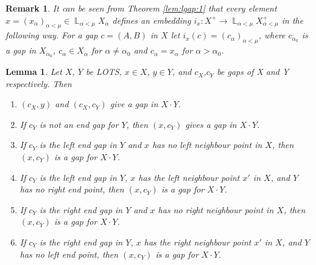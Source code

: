 \documentclass[12pt,oneside,english]{amsbook}
\numberwithin{equation}{section} %
\numberwithin{figure}{section} %
\theoremstyle{plain}
\numberwithin{section}{chapter}
\theoremstyle{plain}
\newtheorem{lem}[thm]{Lemma}
\newtheorem{remark}[thm]{Remark}
\DeclareMathOperator{\LP}{\mathbb{L}}
\begin{document}
\begin{remark}
It can be seen from Theorem \ref{lem:lgap:1} that every element $x = (x_{\alpha})_{\alpha < \mu} \in \LP_{\alpha < \mu}X_{\alpha}$ defines an embedding $i_x : X^+ \to \LP_{\alpha < \mu}X_{\alpha < \mu}^+$ in the following way. For a gap $c = (A,B)$ in $X$ let $i_x(c) = (c_{\alpha})_{\alpha < \mu}$, where $c_{\alpha_0}$ is a gap in $X_{\alpha_0}$, $c_{\alpha} \in X_{\alpha}$ for $\alpha \neq \alpha_0$ and $c_{\alpha} = x_{\alpha}$ for $\alpha > \alpha_0$.
\end{remark}

\begin{lem} \label{lem:lgap:2}
Let $X$, $Y$ be LOTS, $x \in X$, $y \in Y$, and $c_{X}$,$c_{Y}$ be gaps
of X and Y respectively. Then
\begin{enumerate}
\item $(c_{X},y)$ and $(c_{X},c_{Y})$ give a gap in $X \cdot Y$.
\item If $c_{Y}$ is not an end gap for $Y$, then $(x,c_{Y})$ gives a gap in $X \cdot Y$.
\item If $c_{Y}$ is the left end gap in $Y$ and $x$ has no left neighbour point in $X$, then $(x,c_{Y})$ is a gap for $X \cdot Y$.
\item If $c_{Y}$ is the left end gap in $Y$, $x$ has the left neighbour point $x'$ in $X$, and $Y$ has no right end point, then  $(x,c_{Y})$ is a gap for $X \cdot Y$.
\item If $c_{Y}$ is the right end gap in $Y$ and $x$ has no right neighbour point in $X$, then $(x,c_{Y})$ is a gap for $X \cdot Y$.
\item If $c_{Y}$ is the right end gap in $Y$, $x$ has the right neighbour point $x'$ in $X$, and $Y$ has no left end point, then $(x,c_{Y})$ is a gap for $X \cdot Y$.
\end{enumerate}
\end{lem}
\end{document}
